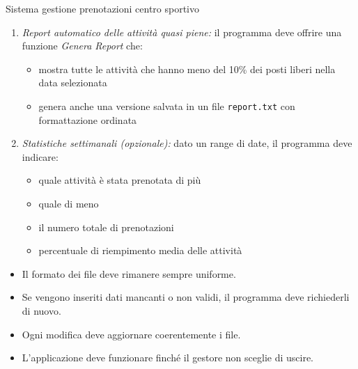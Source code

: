 \begin{esercizioL}{Sistema gestione prenotazioni centro sportivo}
\begin{enumerate}
		\item \textit{Report automatico delle attività quasi piene:} il programma deve offrire una funzione \textit{Genera Report} che:
		      \begin{itemize}
			      \item mostra tutte le attività che hanno meno del 10\% dei posti liberi nella data selezionata
			      \item genera anche una versione salvata in un file \verb|report.txt| con formattazione ordinata
		      \end{itemize}

		\item \textit{Statistiche settimanali (opzionale):} dato un range di date, il programma deve indicare:
		      \begin{itemize}
			      \item quale attività è stata prenotata di più
			      \item quale di meno
			      \item il numero totale di prenotazioni
			      \item percentuale di riempimento media delle attività
		      \end{itemize}
	\end{enumerate}

	\begin{itemize}
		\item Il formato dei file deve rimanere sempre uniforme.
		\item Se vengono inseriti dati mancanti o non validi, il programma deve richiederli di nuovo.
		\item Ogni modifica deve aggiornare coerentemente i file.
		\item L'applicazione deve funzionare finché il gestore non sceglie di uscire.
	\end{itemize}
	\vskip3mm
\end{esercizioL}
\tikzexternalenable
